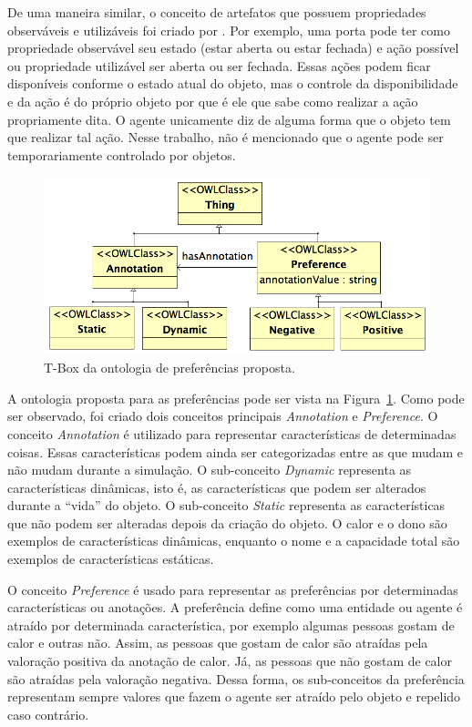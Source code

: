 De uma maneira similar, o conceito de artefatos que possuem propriedades
observáveis e utilizáveis foi criado por \citet{ricci31cartago}. Por exemplo,
uma porta pode ter como propriedade observável seu estado (estar aberta ou
estar fechada) e ação possível ou propriedade utilizável ser aberta ou ser
fechada. Essas ações podem ficar disponíveis conforme o estado atual do
objeto, mas o controle da disponibilidade e da ação é do próprio objeto por
que é ele que sabe como realizar a ação propriamente dita. O agente unicamente
diz de alguma forma que o objeto tem que realizar tal ação. Nesse trabalho,
não é mencionado que o agente pode ser temporariamente controlado por
objetos.

\begin{figure}
  \centering
    \includegraphics[width=130mm]{figuras/preferences.png}
  \caption{T-Box da ontologia de preferências proposta.}
  \label{fig:preferences}
\end{figure}

A ontologia proposta para as preferências pode ser vista na
Figura~\ref{fig:preferences}. Como pode ser observado, foi criado dois
conceitos principais \emph{Annotation} e \emph{Preference}. O conceito
\emph{Annotation} é utilizado para representar características de determinadas
coisas. Essas características podem ainda ser categorizadas entre as que mudam
e não mudam durante a simulação. O sub-conceito \emph{Dynamic} representa as
características dinâmicas, isto é, as características que podem ser alterados
durante a ``vida'' do objeto. O sub-conceito \emph{Static} representa as
características que não podem ser alteradas depois da criação do objeto. O
calor e o dono são exemplos de características dinâmicas, enquanto o nome e a
capacidade total são exemplos de características estáticas.

O conceito \emph{Preference} é usado para representar as preferências por
determinadas características ou anotações. A preferência define como uma entidade ou
agente é atraído por determinada característica, por exemplo algumas pessoas
gostam de calor e outras não. Assim, as pessoas que gostam de calor são
atraídas pela valoração positiva da anotação de calor. Já, as pessoas que não
gostam de calor são atraídas pela valoração negativa. Dessa forma, os
sub-conceitos da preferência representam sempre valores que fazem o agente ser
atraído pelo objeto e repelido caso contrário.

